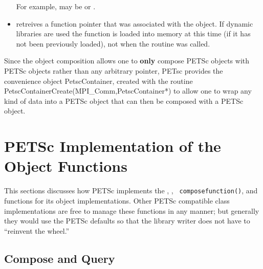 \documentclass[twoside,12pt]{../sty/report_petsc}
\begin{document}
\begin{itemize}
      For example,  may be  or
      .

\item {} retreives a function pointer that
      was associated with the object. If dynamic libraries are used the function is loaded
      into memory at this time (if it has not been previously loaded), not when the
       routine was called.

\end{itemize}

Since the object composition allows one to {\bf only} compose PETSc objects
with PETSc objects rather than any arbitrary pointer, PETsc provides
the convenience object PetscContainer, created with the
routine PetscContainerCreate(MPI\_Comm,PetscContainer*)
to allow one to wrap any kind of data into a PETSc object that can then be
composed with a PETSc object.

\section{PETSc Implementation of the  Object Functions}

This sections discusses how PETSc implements the , , {\tt
composefunction()}, and  functions for its object implementations.
Other PETSc compatible class implementations are free to manage these functions in any
manner; but generally they would use the PETSc defaults so that the library writer does
not have to ``reinvent the wheel.''

\subsection{Compose and Query}
\end{document}
